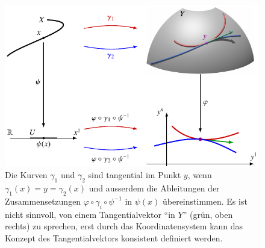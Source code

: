 %
%
%
\begin{figure}
\centering
\includegraphics{chapters/020-koordinaten/images/kurve.pdf}
\caption{Die Kurven $\gamma_1$ und $\gamma_2$ sind tangential im
Punkt $y$, wenn $\gamma_1(x)=y=\gamma_2(x)$ und ausserdem die
Ableitungen der Zusammensetzungen $\varphi\circ\gamma_i\circ\psi^{-1}$
in $\psi(x)$ übereinstimmen.
Es ist nicht sinnvoll, von einem Tangentialvektor ``in $Y$'' (grün,
oben rechts) zu sprechen, erst durch das Koordinatensystem kann
das Konzept des Tangentialvektors konsistent definiert werden.
\label{buch:koordinaten:tangentialvektoren:fig:kurve}}
\end{figure}
